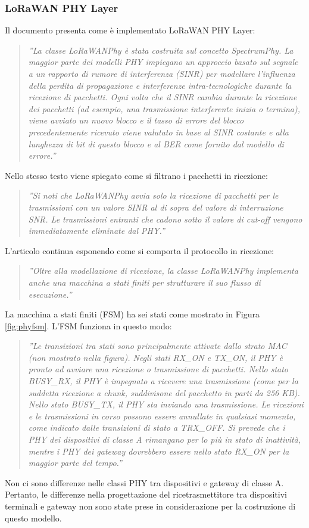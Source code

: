 \documentclass[a4paper]{report} %
\begin{document}
\subsubsection{LoRaWAN PHY Layer}
Il documento \cite{art:rif.49} presenta come è implementato LoRaWAN PHY Layer:
\begin{quote}
	\textit{''La classe LoRaWANPhy è stata costruita sul concetto SpectrumPhy. La maggior parte dei modelli PHY impiegano un approccio basato sul segnale a un rapporto di rumore di interferenza (SINR) per modellare l'influenza della perdita di propagazione e interferenze intra-tecnologiche durante la ricezione di pacchetti. Ogni volta che il SINR cambia durante la ricezione dei pacchetti (ad esempio, una trasmissione interferente inizia o termina), viene avviato un nuovo blocco e il tasso di errore del blocco precedentemente ricevuto viene valutato in base al SINR costante e alla lunghezza di bit di questo blocco e al BER come fornito dal modello di errore.''}
\end{quote}
Nello stesso testo viene spiegato come si filtrano i pacchetti in ricezione:
\begin{quote}
	\textit{''Si noti che LoRaWANPhy avvia solo la ricezione di pacchetti per le trasmissioni con un valore SINR al di sopra del valore di interruzione SNR. Le trasmissioni entranti che cadono sotto il valore di cut-off vengono immediatamente eliminate dal PHY.''}
\end{quote}
L'articolo continua esponendo come si comporta il protocollo in ricezione:
\begin{quote}
	\textit{''Oltre alla modellazione di ricezione, la classe LoRaWANPhy implementa anche una macchina a stati finiti per strutturare il suo flusso di esecuzione.''}
\end{quote}
La macchina a stati finiti (FSM) ha sei stati come mostrato in Figura \ref{fig:phyfsm}. L'FSM funziona in questo modo:
\begin{quote}
	\textit{''Le transizioni tra stati sono principalmente attivate dallo strato MAC (non mostrato nella figura). Negli stati RX\_ON e TX\_ON, il PHY è pronto ad avviare una ricezione o trasmissione di pacchetti. Nello stato BUSY\_RX, il PHY è impegnato a ricevere una trasmissione (come per la suddetta ricezione a chunk, suddivisone del pacchetto in parti da 256 KB). Nello stato BUSY\_TX, il PHY sta inviando una trasmissione. Le ricezioni e le trasmissioni in corso possono essere annullate in qualsiasi momento, come indicato dalle transizioni di stato a TRX\_OFF. Si prevede che i PHY dei dispositivi di classe A rimangano per lo più in stato di inattività, mentre i PHY dei gateway dovrebbero essere nello stato RX\_ON per la maggior parte del tempo.''}
\end{quote}
Non ci sono differenze nelle classi PHY tra dispositivi e gateway di classe A. Pertanto, le differenze nella progettazione del ricetrasmettitore tra dispositivi terminali e gateway non sono state prese in considerazione per la costruzione di questo modello.
\end{document}
